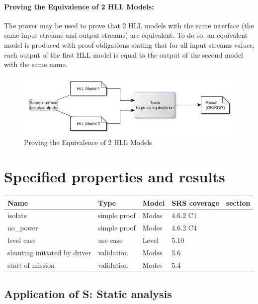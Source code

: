 \documentclass{article}
\newcommand{\smartsolver}{\mbox{S\textsmaller[1]{3}}\xspace}
\newcommand{\HLL}{{HLL}}
\begin{document}
\paragraph{ Proving the Equivalence of 2 \HLL{} Models: } The prover may be used to prove that 2 \HLL{} models with the same interface (the same input streams and output streams) are equivalent. To do so, an equivalent model is produced with proof obligations stating that for all input streams values, each output of the first \HLL{} model is equal to the output of the second model with the same name.
\begin{figure}[h!]
\centering
\includegraphics[width=1\textwidth]{Use_equivalence_checker}
\caption{Proving the Equivalence of 2 \HLL{} Models}
\label{fig:eqch}
\end{figure}


\section{Specified properties and results}

\begin{tabular}{|l|l|l|l|l}
\hline
\textbf{Name} & \textbf{Type} & \textbf{Model} & \textbf{SRS coverage} & \textbf{section} \\ \hline
isolate & simple proof & Modes  & 4.6.2 C1 &\\
no\_power & simple proof & Modes  & 4.6.2 C4 &\\
level case & use case & Level  & 5.10 &\\
shunting initiated by driver & validation & Modes  & 5.6 &\\
start of mission & validation & Modes  & 5.4 &\\
\hline
\end{tabular}


\subsection{Application of \smartsolver{}: Static analysis}
\label{sec:static-analysis}
\end{document}
